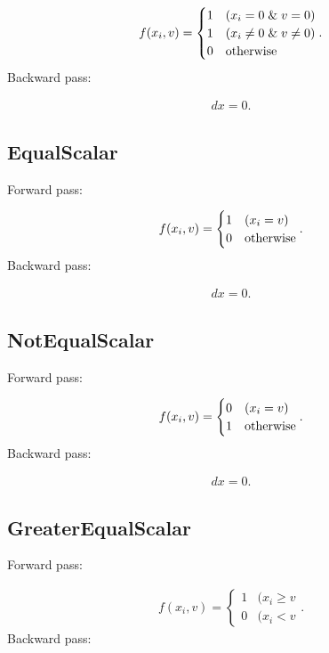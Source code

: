 \documentclass{article}
\begin{document}
\begin{eqnarray}
  f(x_i,v) = \begin{cases}
    1 & (x_i = 0 \;\&\; v = 0) \\
    1 & (x_i \neq 0 \;\&\; v \neq 0) \\
    0 & {\rm otherwise}
  \end{cases}.
\end{eqnarray}
%
Backward pass:

\begin{eqnarray}
  dx = 0.
\end{eqnarray}

\subsection{EqualScalar}

Forward pass:

\begin{eqnarray}
  f(x_i,v) = \begin{cases}
    1 & (x_i = v) \\
    0 & {\rm otherwise}
  \end{cases}.
\end{eqnarray}
%
Backward pass:

\begin{eqnarray}
  dx = 0.
\end{eqnarray}

\subsection{NotEqualScalar}

Forward pass:

\begin{eqnarray}
  f(x_i,v) = \begin{cases}
    0 & (x_i = v) \\
    1 & {\rm otherwise}
  \end{cases}.
\end{eqnarray}
%
Backward pass:

\begin{eqnarray}
  dx = 0.
\end{eqnarray}

\subsection{GreaterEqualScalar}

Forward pass:

\begin{eqnarray}
  f(x_i,v) = \begin{cases}
    1  & (x_i \geq v \\
    0 & (x_i < v
  \end{cases}.
\end{eqnarray}
%
Backward pass:
\end{document}
